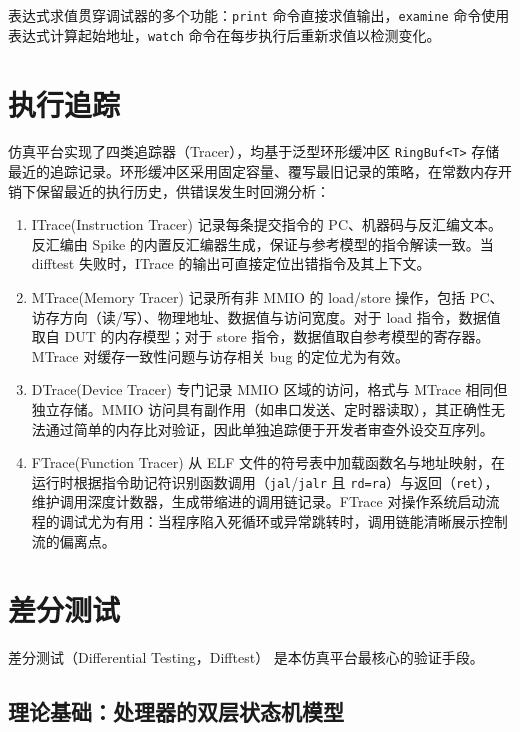表达式求值贯穿调试器的多个功能：\lstinline|print| 命令直接求值输出，\lstinline|examine| 命令使用表达式计算起始地址，\lstinline|watch| 命令在每步执行后重新求值以检测变化。

\section{执行追踪}

仿真平台实现了四类追踪器（Tracer），均基于泛型环形缓冲区 \lstinline|RingBuf<T>| 存储最近的追踪记录。环形缓冲区采用固定容量、覆写最旧记录的策略，在常数内存开销下保留最近的执行历史，供错误发生时回溯分析：

\begin{enumerate}
  \item ITrace(Instruction Tracer) 记录每条提交指令的 PC、机器码与反汇编文本。反汇编由 Spike 的内置反汇编器生成，保证与参考模型的指令解读一致。当 difftest 失败时，ITrace 的输出可直接定位出错指令及其上下文。
  \item MTrace(Memory Tracer) 记录所有非 MMIO 的 load/store 操作，包括 PC、访存方向（读/写）、物理地址、数据值与访问宽度。对于 load 指令，数据值取自 DUT 的内存模型；对于 store 指令，数据值取自参考模型的寄存器。MTrace 对缓存一致性问题与访存相关 bug 的定位尤为有效。
  \item DTrace(Device Tracer) 专门记录 MMIO 区域的访问，格式与 MTrace 相同但独立存储。MMIO 访问具有副作用（如串口发送、定时器读取），其正确性无法通过简单的内存比对验证，因此单独追踪便于开发者审查外设交互序列。
  \item FTrace(Function Tracer) 从 ELF 文件的符号表中加载函数名与地址映射，在运行时根据指令助记符识别函数调用（\lstinline|jal|/\lstinline|jalr| 且 \lstinline|rd=ra|）与返回（\lstinline|ret|），维护调用深度计数器，生成带缩进的调用链记录。FTrace 对操作系统启动流程的调试尤为有用：当程序陷入死循环或异常跳转时，调用链能清晰展示控制流的偏离点。
\end{enumerate}

\section{差分测试}\label{sec:difftest}

差分测试（Differential Testing，Difftest）\cite{you2025difftest} 是本仿真平台最核心的验证手段。

\subsection{理论基础：处理器的双层状态机模型}

